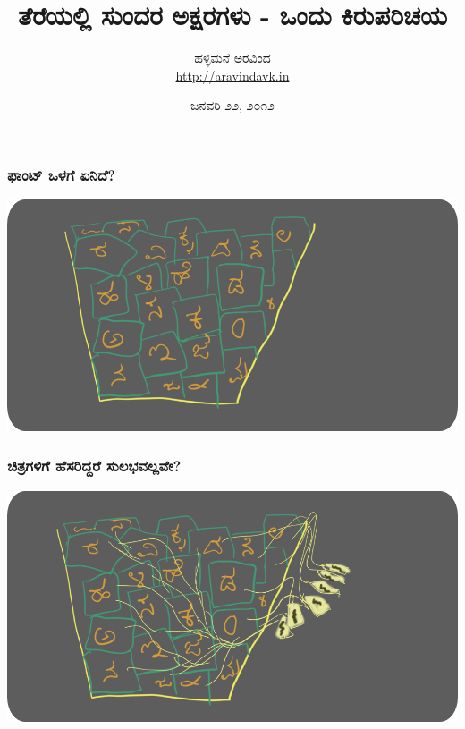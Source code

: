 \documentclass[16pt]{beamer}
\begin{document}
\color{white}
\title{ತೆರೆಯಲ್ಲಿ ಸುಂದರ ಅಕ್ಷರಗಳು - ಒಂದು ಕಿರುಪರಿಚಯ}
\author{\color{yellow}ಹಳ್ಳಿಮನೆ ಅರವಿಂದ \\ \url{http://aravindavk.in}}
\date{ಜನವರಿ ೨೨, ೨೦೧೨}

\begin{spacing}{1.6}
  \begin{frame}
    \maketitle
  \end{frame}

  \begin{frame}
    \frametitle{ಫಾಂಟ್ ಒಳಗೆ ಏನಿದೆ?}
    \includegraphics[width=\textwidth]{images/without-tags-bg.png}
  \end{frame}

  \begin{frame}
    \frametitle{ಚಿತ್ರಗಳಿಗೆ ಹೆಸರಿದ್ದರೆ ಸುಲಭವಲ್ಲವೇ?}
    \includegraphics[width=\textwidth]{images/with-tags-bg.png}
  \end{frame}


\end{spacing}
\end{document}
